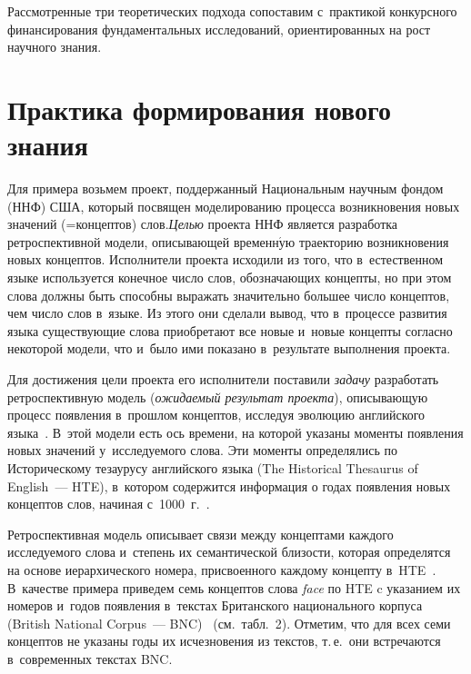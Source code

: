 \begin{multicols}{2}
  Рассмотренные три теоретических подхода сопоставим с~практикой 
конкурсного финансирования фундаментальных исследований, 
ориентированных на рост научного знания.

\vspace*{-4pt}
  
\section{Практика формирования нового знания}

\vspace*{-2pt}
    
  Для примера возьмем проект, поддержанный Национальным научным 
фондом (ННФ) США, который посвящен моделированию процесса 
возникновения новых значений (=\;кон\-цеп\-тов) слов.\linebreak \textit{Целью} проекта 
ННФ является разработка рет\-ро\-спективной модели, описывающей временн$\acute{\mbox{у}}$ю\linebreak 
траекторию возникновения новых концептов. Исполнители проекта исходили 
из того, что в~естественном языке используется конечное число слов, 
обозначающих концепты, но при этом слова должны быть способны выражать 
значительно большее чис\-ло концептов, чем число слов в~языке. Из этого они 
сделали вывод, что в~процессе развития языка существующие слова 
приобретают все новые и~новые концепты согласно некоторой модели, что 
и~было ими показано в~результате выполнения проекта.
  
  Для достижения цели проекта его исполнители поставили \textit{задачу} 
разработать ретроспективную модель (\textit{ожидаемый результат 
проекта}), описывающую процесс появления в~прошлом концептов, исследуя 
эволюцию английского языка~\cite{9-zat}. В~этой модели есть ось времени, на 
которой указаны моменты появления новых значений у~исследуемого слова. 
Эти моменты определялись по Историческому тезаурусу английского языка 
(The Historical Thesaurus of English~--- HTE), в~котором содержится 
информация о годах появления новых концептов слов, начиная 
с~1000~г.~\cite{10-zat}.
  
  Ретроспективная модель описывает связи между концептами каждого 
исследуемого слова и~степень их семантической близости, которая определятся 
на основе иерархического номера, присвоенного каждому концепту 
в~HTE~\cite{11-zat}. В~качестве примера приведем семь концептов слова 
\textit{face} по HTE c указанием их номеров и~годов появления в~текстах 
Британского национального корпуса (British National Corpus~--- 
 BNC)~\cite{12-zat} (см.\ табл.~2). Отметим, что для всех семи концептов не 
указаны годы их исчезновения из текстов, т.\,е.\ они встречаются 
в~современных текстах BNC.
  


\end{multicols}

